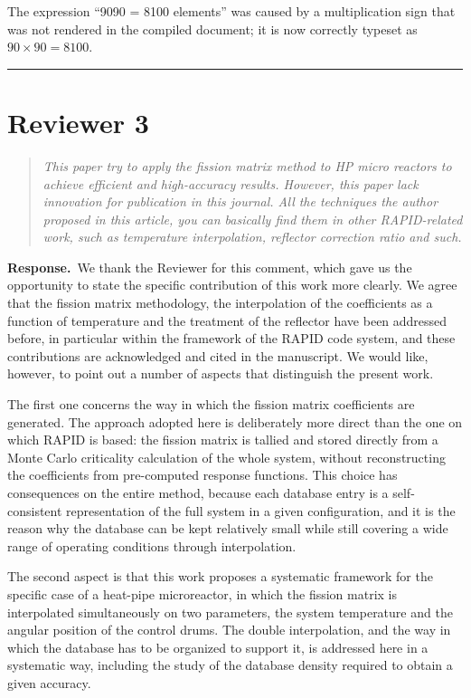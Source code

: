 \documentclass[11pt]{article}
\newenvironment{reviewer}%
  {\medskip\begin{quote}\itshape\color{black!70}}%
  {\end{quote}}
\newcommand{\answer}{\textbf{Response.}\ }
\begin{document}
The expression ``9090 = 8100 elements'' was caused by a multiplication sign that was not rendered in the compiled document; it is now correctly typeset as $90 \times 90 = 8100$.

\bigskip
\hrule
\bigskip

\section*{Reviewer 3}

\begin{reviewer}
This paper try to apply the fission matrix method to HP micro reactors to achieve efficient and high-accuracy results. However, this paper lack innovation for publication in this journal. All the techniques the author proposed in this article, you can basically find them in other RAPID-related work, such as temperature interpolation, reflector correction ratio and such.
\end{reviewer}

\answer We thank the Reviewer for this comment, which gave us the opportunity to state the specific contribution of this work more clearly. We agree that the fission matrix methodology, the interpolation of the coefficients as a function of temperature and the treatment of the reflector have been addressed before, in particular within the framework of the RAPID code system, and these contributions are acknowledged and cited in the manuscript. We would like, however, to point out a number of aspects that distinguish the present work.

The first one concerns the way in which the fission matrix coefficients are generated. The approach adopted here is deliberately more direct than the one on which RAPID is based: the fission matrix is tallied and stored directly from a Monte Carlo criticality calculation of the whole system, without reconstructing the coefficients from pre-computed response functions. This choice has consequences on the entire method, because each database entry is a self-consistent representation of the full system in a given configuration, and it is the reason why the database can be kept relatively small while still covering a wide range of operating conditions through interpolation.

The second aspect is that this work proposes a systematic framework for the specific case of a heat-pipe microreactor, in which the fission matrix is interpolated simultaneously on two parameters, the system temperature and the angular position of the control drums. The double interpolation, and the way in which the database has to be organized to support it, is addressed here in a systematic way, including the study of the database density required to obtain a given accuracy.
\end{document}

